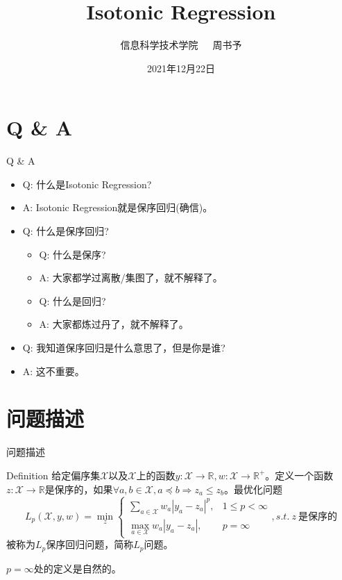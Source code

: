 \documentclass{beamer}
\title{Isotonic Regression}
\date{2021年12月22日}
\author{信息科学技术学院\ \ \ 周书予}
\begin{document}
\small
	
	\begin{frame}
	\titlepage
	\end{frame}
\section{Q \& A}
\begin{frame}{Q \& A}
\begin{itemize}
	\item Q: 什么是Isotonic Regression?\pause
	\item A: Isotonic Regression就是保序回归(确信)。\pause
	\item Q: 什么是保序回归?\pause
	\begin{itemize}
		\item Q: 什么是保序?\pause
		\item A: 大家都学过离散/集图了，就不解释了。\pause
		\item Q: 什么是回归?\pause
		\item A: 大家都炼过丹了，就不解释了。		\pause
	\end{itemize}
	\item Q: 我知道保序回归是什么意思了，但是你是谁?\pause
	\item A: 这不重要。
\end{itemize}
\end{frame}
\section{问题描述}
\begin{frame}{问题描述}
\begin{block}{Definition}
	给定偏序集$\mathcal X$以及$\mathcal X$上的函数$y: \mathcal X \to \mathbb R, w: \mathcal X \to \mathbb R^+$。定义一个函数$z: \mathcal X \to \mathbb R$是保序的，如果$\forall a, b \in \mathcal X,  a \preceq b \Rightarrow z_a \le z_b$。最优化问题
	$$L_p(\mathcal X, y, w) = \min_{z}\begin{cases}
	\sum_{a \in \mathcal X}w_a|y_a - z_a|^p, & 1 \le p < \infty\\
	\max_{a \in \mathcal X}w_a|y_a - z_a|, & p = \infty
	\end{cases}, s.t.\ z\ \mbox{是保序的}$$
	被称为$L_p$保序回归问题，简称$L_p$问题。
\end{block}
\pause
$p = \infty$处的定义是自然的。
\end{frame}
\iffalse
\end{document}
